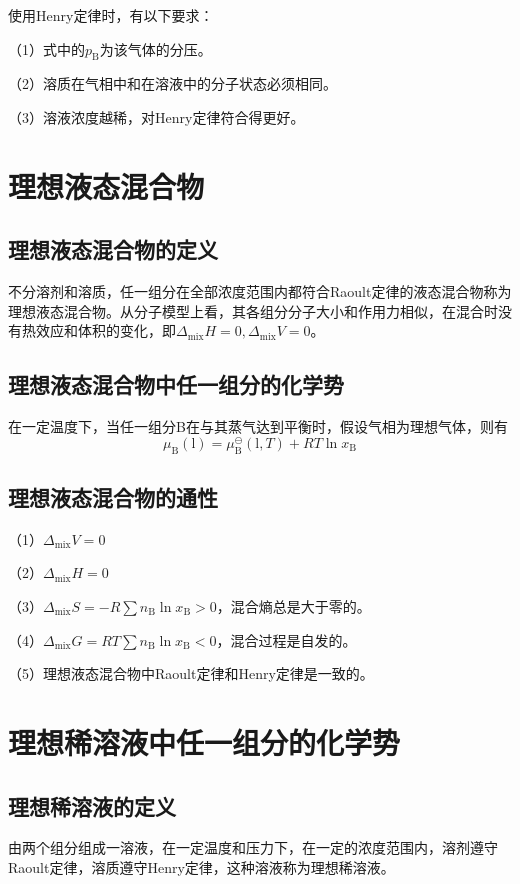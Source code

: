 \documentclass[lang=cn,newtx,11pt,scheme=chinese]{elegantbook}
\begin{document}
使用Henry定律时，有以下要求：

（1）式中的$p_\mathrm{B}$为该气体的分压。

（2）溶质在气相中和在溶液中的分子状态必须相同。

（3）溶液浓度越稀，对Henry定律符合得更好。

\section{理想液态混合物}
\subsection{理想液态混合物的定义}
不分溶剂和溶质，任一组分在全部浓度范围内都符合Raoult定律的液态混合物称为理想液态混合物。从分子模型上看，其各组分分子大小和作用力相似，在混合时没有热效应和体积的变化，即$\Delta_\mathrm{mix}H=0,\Delta_\mathrm{mix}V=0$。

\subsection{理想液态混合物中任一组分的化学势}
在一定温度下，当任一组分B在与其蒸气达到平衡时，假设气相为理想气体，则有
\begin{equation}
	\mu_\mathrm{B}(\mathrm{l}) = \mu_\mathrm{B}^\ominus(\mathrm{l},T)+RT\ln x_\mathrm{B}
\end{equation}

\subsection{理想液态混合物的通性}
（1）$\Delta_\mathrm{mix} V=0$

（2）$\Delta_\mathrm{mix} H=0$

（3）$\Delta_\mathrm{mix} S=-R \sum n_\mathrm{B}\ln x_\mathrm{B} > 0$，混合熵总是大于零的。

（4）$\Delta_\mathrm{mix} G = RT\sum n_\mathrm{B}\ln x_\mathrm{B} < 0$，混合过程是自发的。

（5）理想液态混合物中Raoult定律和Henry定律是一致的。

\section{理想稀溶液中任一组分的化学势}
\subsection{理想稀溶液的定义}
由两个组分组成一溶液，在一定温度和压力下，在一定的浓度范围内，溶剂遵守Raoult定律，溶质遵守Henry定律，这种溶液称为理想稀溶液。
\end{document}
